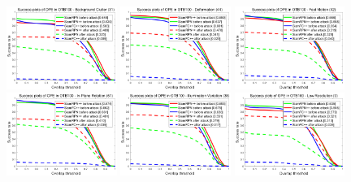 \documentclass[journal]{IEEEtran}
\begin{document}
\begin{figure}[t!]
  \begin{center}
    \includegraphics[width=0.32\textwidth]{images/OTB2015/success_plot_OPE_OTB100_BC.png}
    \includegraphics[width=0.32\textwidth]{images/OTB2015/success_plot_OPE_OTB100_DEF.png}
    \includegraphics[width=0.32\textwidth]{images/OTB2015/success_plot_OPE_OTB100_FM.png}
    \includegraphics[width=0.32\textwidth]{images/OTB2015/success_plot_OPE_OTB100_IPR.png}
    \includegraphics[width=0.32\textwidth]{images/OTB2015/success_plot_OPE_OTB100_IV.png}
    \includegraphics[width=0.32\textwidth]{images/OTB2015/success_plot_OPE_OTB100_LR.png}

\end{center}
\end{figure}
\end{document}
